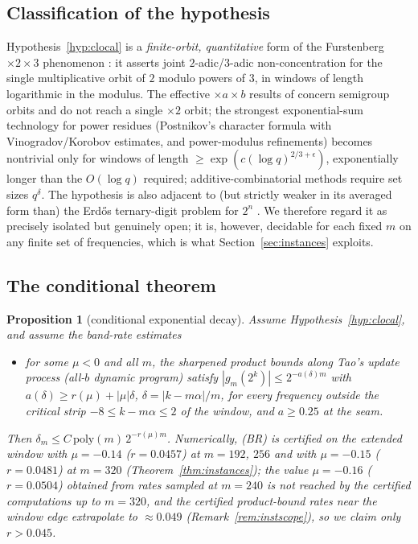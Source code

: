 \documentclass[11pt]{article}
\newtheorem{proposition}[theorem]{Proposition}
\theoremstyle{definition}
\begin{document}
\subsection{Classification of the hypothesis}
Hypothesis~\ref{hyp:clocal} is a \emph{finite-orbit, quantitative} form
of the Furstenberg $\times 2\times 3$ phenomenon
\cite{Furstenberg1967}: it asserts joint $2$-adic/$3$-adic
non-concentration for the single multiplicative orbit of $2$ modulo
powers of $3$, in windows of length logarithmic in the modulus. The
effective $\times a\times b$ results of \cite{BLMV2009} concern
semigroup orbits and do not reach a single $\times 2$ orbit; the
strongest exponential-sum technology for power residues (Postnikov's
character formula with Vinogradov/Korobov estimates, and power-modulus
refinements) becomes nontrivial only for windows of length
$\ge \exp(c(\log q)^{2/3+\epsilon})$, exponentially longer than the
$O(\log q)$ required; additive-combinatorial methods require set sizes
$q^{\delta}$. The hypothesis is also adjacent to (but strictly weaker
in its averaged form than) the Erd\H{o}s ternary-digit problem for
$2^n$ \cite{Erdos1979,Lagarias2009}. We therefore regard it as
precisely isolated but genuinely open; it is, however, decidable for
each fixed $m$ on any finite set of frequencies, which is what
Section~\ref{sec:instances} exploits.

\subsection{The conditional theorem}

\begin{proposition}[conditional exponential decay]\label{thm:conditional}
Assume Hypothesis~\ref{hyp:clocal}, and assume the band-rate estimates
\begin{itemize}
\item[(BR)] for some $\mu<0$ and all $m$, the sharpened product bounds
  along Tao's update process (all-$b$ dynamic program) satisfy
  $|g_m(2^k)|\le 2^{-a(\delta)m}$ with $a(\delta)\ge r(\mu)+|\mu|\delta$,
  $\delta=|k-m\alpha|/m$, for every frequency outside the critical strip
  $-8\le k-m\alpha\le 2$ of the window, and $a\ge 0.25$ at the seam.
\end{itemize}
Then $\delta_m\le C\,\mathrm{poly}(m)\,2^{-r(\mu)m}$. Numerically, (BR)
is certified on the extended window with $\mu=-0.14$ ($r=0.0457$) at
$m=192$, $256$ and with $\mu=-0.15$ ($r=0.0481$) at $m=320$
(Theorem~\ref{thm:instances}); the value $\mu=-0.16$ ($r=0.0504$)
obtained from rates sampled at $m=240$ is not reached by the certified
computations up to $m=320$, and the certified product-bound rates near
the window edge extrapolate to $\approx 0.049$
(Remark~\ref{rem:instscope}), so we claim only $r>0.045$.
\end{proposition}
\end{document}
